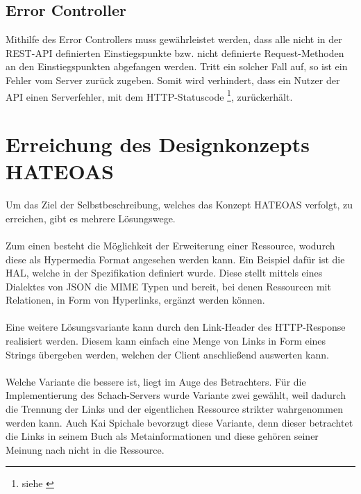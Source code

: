 \subsection{Error Controller}\label{sec:errorController}
Mithilfe des Error Controllers muss gewährleistet werden, dass alle nicht in der \gls{REST}-\gls{API} definierten Einstiegspunkte bzw. nicht definierte Request-Methoden an den Einstiegspunkten abgefangen werden. Tritt ein solcher Fall auf, so ist ein Fehler vom Server zurück zugeben. Somit wird verhindert, dass ein Nutzer der \gls{API} einen Serverfehler, mit dem HTTP-Statuscode \footnote{siehe \cite[A.2.5]{kretzschmar}}, zurückerhält.

\section{Erreichung des Designkonzepts HATEOAS}\label{sec:konzeptHATEOAS}
Um das Ziel der Selbstbeschreibung, welches das Konzept HATEOAS verfolgt, zu erreichen, gibt es mehrere Lösungswege.\\
\\
Zum einen besteht die Möglichkeit der Erweiterung einer Ressource, wodurch diese als Hypermedia Format angesehen werden kann. Ein Beispiel dafür ist die \gls{HAL}, welche in der Spezifikation \cite{halSpezification} definiert wurde. Diese stellt mittels eines Dialektes von \gls{JSON} die \gls{MIME} Typen  und  bereit, bei denen Ressourcen mit Relationen, in Form von Hyperlinks, ergänzt werden können.\\
\\
Eine weitere Lösungsvariante kann durch den Link-Header des \gls{HTTP}-Response realisiert werden. Diesem kann einfach eine Menge von Links in Form eines Strings übergeben werden, welchen der Client anschließend auswerten kann.\\
\\
Welche Variante die bessere ist, liegt im Auge des Betrachters. Für die Implementierung des Schach-Servers wurde Variante zwei gewählt, weil dadurch die Trennung der Links und der eigentlichen Ressource strikter wahrgenommen werden kann. Auch Kai Spichale bevorzugt diese Variante, denn dieser betrachtet die Links in seinem Buch \cite[158]{apiDesign} als Metainformationen und diese gehören seiner Meinung nach nicht in die Ressource.
